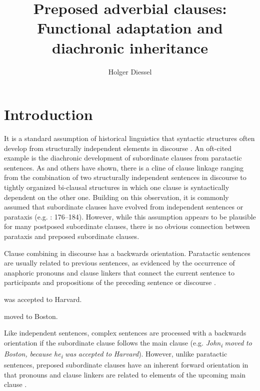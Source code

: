 \documentclass[output=paper]{langsci/langscibook}
\author{Holger Diessel\affiliation{University of Jena}}
\title{Preposed adverbial clauses: Functional adaptation and diachronic inheritance}
\begin{document}
\maketitle 

\section{Introduction}

It is a standard assumption of historical linguistics that syntactic structures often develop from structurally independent elements in discourse \citep{Givón1979}. An oft-cited example is the diachronic development of subordinate clauses from paratactic sentences. As \citet{Lehmann1988} and others have shown, there is a cline of clause linkage ranging from the combination of two structurally independent sentences in discourse to tightly organized bi-clausal structures in which one clause is syntactically dependent on the other one. Building on this observation, it is commonly assumed that subordinate clauses have evolved from independent sentences or parataxis (e.g. \citealt{HopperTraugott2003}: 176--184). However, while this assumption appears to be plausible for many postposed subordinate clauses, there is no obvious connection between parataxis and preposed subordinate clauses.

Clause combining in discourse has a backwards orientation. Paratactic sentences are usually related to previous sentences, as evidenced by the occurrence of anaphoric pronouns and clause linkers that connect the current sentence to participants and propositions of the preceding sentence or discourse .
 

\ea%
\label{ex:diessel:1}
 was accepted to Harvard.  \textit{} moved to Boston.
\z


Like independent sentences, complex sentences are processed with a backwards orientation if the subordinate clause follows the main clause (e.g. \textit{John\textsubscript{i}} \textit{moved} \textit{to} \textit{Boston,} \textit{because} \textit{he\textsubscript{i}} \textit{was} \textit{accepted} \textit{to} \textit{Harvard}). However, unlike paratactic sentences, preposed subordinate clauses have an inherent forward orientation in that pronouns and clause linkers are related to elements of the upcoming main clause .
\end{document}
